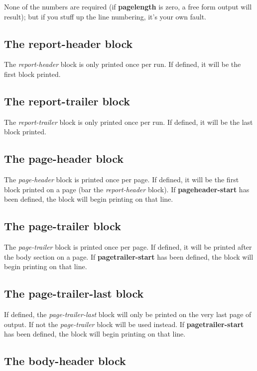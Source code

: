 \documentclass[a4paper,twoside]{article}
\begin{document}
	None of the numbers are required (if \textbf{pagelength} is zero,
	a free form output will result); but if you stuff up the line
	numbering, it's your own fault.

\subsection{The report-header block}

	The \emph{report-header} block is only printed once per run. If
	defined, it will be the first block printed.

\subsection{The report-trailer block}

	The \emph{report-trailer} block is only printed once per run. If
	defined, it will be the last block printed.

\subsection{The page-header block}

	The \emph{page-header} block is printed once per page. If defined,
	it will be the first block printed on a page (bar the
	\emph{report-header} block). If \textbf{pageheader-start} has been
	defined, the block will begin printing on that line.

\subsection{The page-trailer block}

	The \emph{page-trailer} block is printed once per page. If defined,
	it will be printed after the body section on a page.
	If \textbf{pagetrailer-start} has been
	defined, the block will begin printing on that line.

\subsection{The page-trailer-last block}

	If defined, the \emph{page-trailer-last} block will only be
	printed on the very last page of output. If not the
	\emph{page-trailer} block will be used instead.
	If \textbf{pagetrailer-start} has been
	defined, the block will begin printing on that line.

\subsection{The body-header block}
\end{document}
